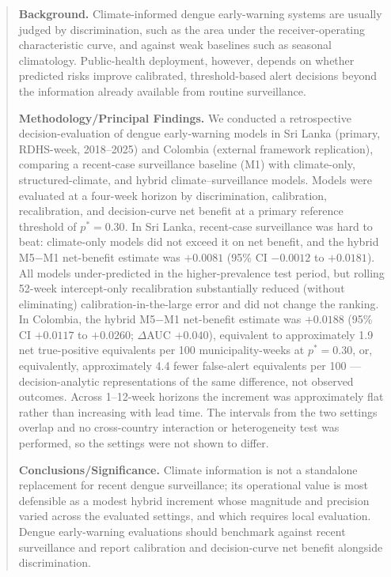 \documentclass[11pt,a4paper]{article}
\begin{document}
\begin{abstract}
\noindent\textbf{Background.}
Climate-informed dengue early-warning systems are usually judged by discrimination, such as the area under the receiver-operating characteristic curve, and against weak baselines such as seasonal climatology. Public-health deployment, however, depends on whether predicted risks improve calibrated, threshold-based alert decisions beyond the information already available from routine surveillance.

\noindent\textbf{Methodology/Principal Findings.}
We conducted a retrospective decision-evaluation of dengue early-warning models in Sri Lanka (primary, RDHS-week, 2018--2025) and Colombia (external framework replication), comparing a recent-case surveillance baseline (M1) with climate-only, structured-climate, and hybrid climate--surveillance models. Models were evaluated at a four-week horizon by discrimination, calibration, recalibration, and decision-curve net benefit at a primary reference threshold of $p^*=0.30$. In Sri Lanka, recent-case surveillance was hard to beat: climate-only models did not exceed it on net benefit, and the hybrid M5$-$M1 net-benefit estimate was $+0.0081$ (95\% CI $-0.0012$ to $+0.0181$). All models under-predicted in the higher-prevalence test period, but rolling 52-week intercept-only recalibration substantially reduced (without eliminating) calibration-in-the-large error and did not change the ranking. In Colombia, the hybrid M5$-$M1 net-benefit estimate was $+0.0188$ (95\% CI $+0.0117$ to $+0.0260$; $\Delta$AUC $+0.040$), equivalent to approximately 1.9 net true-positive equivalents per 100 municipality-weeks at $p^*=0.30$, or, equivalently, approximately 4.4 fewer false-alert equivalents per 100 --- decision-analytic representations of the same difference, not observed outcomes. Across 1--12-week horizons the increment was approximately flat rather than increasing with lead time. The intervals from the two settings overlap and no cross-country interaction or heterogeneity test was performed, so the settings were not shown to differ.

\noindent\textbf{Conclusions/Significance.}
Climate information is not a standalone replacement for recent dengue surveillance; its operational value is most defensible as a modest hybrid increment whose magnitude and precision varied across the evaluated settings, and which requires local evaluation. Dengue early-warning evaluations should benchmark against recent surveillance and report calibration and decision-curve net benefit alongside discrimination.
\end{abstract}
\end{document}
